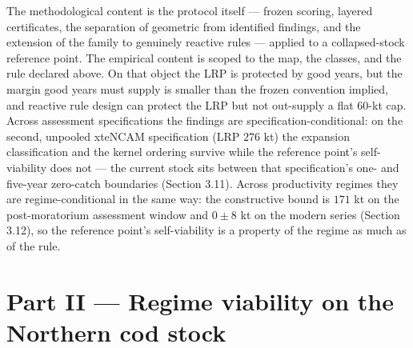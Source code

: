 The methodological content is the protocol itself --- frozen scoring,
layered certificates, the separation of geometric from identified
findings, and the extension of the family to genuinely reactive rules
--- applied to a collapsed-stock reference point. The empirical content
is scoped to the map, the classes, and the rule declared above. On that
object the LRP is protected by good years, but the margin good years
must supply is smaller than the frozen convention implied, and reactive
rule design can protect the LRP but not out-supply a flat 60-kt cap.
Across assessment specifications the findings are
specification-conditional: on the second, unpooled xteNCAM specification
(LRP \(276\) kt) the expansion classification and the kernel ordering
survive while the reference point's self-viability does not --- the
current stock sits between that specification's one- and five-year
zero-catch boundaries (Section 3.11). Across productivity regimes they are
regime-conditional in the same way: the constructive bound is
\(171\) kt on the post-moratorium assessment window and \(0 \pm 8\)
kt on the modern series (Section 3.12), so the reference point's
self-viability is a property of the regime as much as of the rule.

\part*{Part II --- Regime viability on the Northern cod stock}
\label{part:regime}

